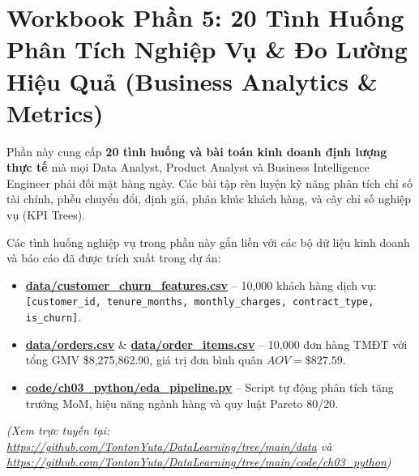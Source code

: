 \chapter{Workbook Phần 5: 20 Tình Huống Phân Tích Nghiệp Vụ \& Đo Lường Hiệu Quả (Business Analytics \& Metrics)}

\begin{lythuyetbox}
Phần này cung cấp \textbf{20 tình huống và bài toán kinh doanh định lượng thực tế} mà mọi Data Analyst, Product Analyst và Business Intelligence Engineer phải đối mặt hàng ngày. Các bài tập rèn luyện kỹ năng phân tích chỉ số tài chính, phễu chuyển đổi, định giá, phân khúc khách hàng, và cây chỉ số nghiệp vụ (KPI Trees).
\end{lythuyetbox}

\begin{thuchanhbox}
Các tình huống nghiệp vụ trong phần này gắn liền với các bộ dữ liệu kinh doanh và báo cáo đã được trích xuất trong dự án:
\begin{itemize}
    \item \href{run:./data/customer_churn_features.csv}{\Large\textbf{\color{navyprimary}data/customer\_churn\_features.csv}} -- 10,000 khách hàng dịch vụ: \texttt{[customer\_id, tenure\_months, monthly\_charges, contract\_type, is\_churn]}.
    \item \href{run:./data/orders.csv}{\Large\textbf{\color{navyprimary}data/orders.csv}} \& \href{run:./data/order_items.csv}{\Large\textbf{\color{navyprimary}data/order\_items.csv}} -- 10,000 đơn hàng TMĐT với tổng GMV \$8,275,862.90, giá trị đơn bình quân $AOV = \$827.59$.
    \item \href{run:./code/ch03_python/eda_pipeline.py}{\Large\textbf{\color{navyprimary}code/ch03\_python/eda\_pipeline.py}} -- Script tự động phân tích tăng trưởng MoM, hiệu năng ngành hàng và quy luật Pareto 80/20.
\end{itemize}
\small\textit{(Xem trực tuyến tại: \url{https://github.com/TontonYuta/DataLearning/tree/main/data} và \url{https://github.com/TontonYuta/DataLearning/tree/main/code/ch03_python})}
\end{thuchanhbox}

